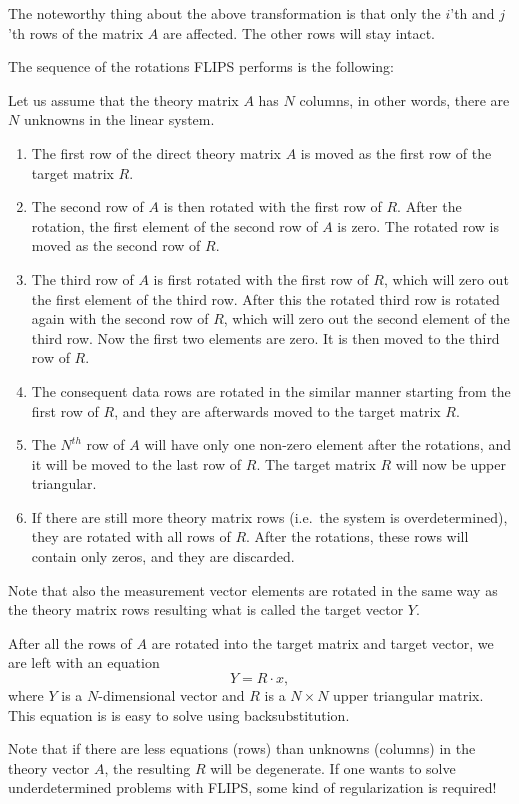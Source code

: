 \documentclass[a4paper,twoside]{refrep}
\begin{document}
\attention The noteworthy thing about the above transformation is that only the $i$'th and $j$'th rows of the matrix $A$ are affected. The other rows will stay intact.

The sequence of the rotations FLIPS performs is the following:

Let us assume that the theory matrix $A$ has $N$ columns, in other words, there are $N$ unknowns in the linear system.

\begin{enumerate}
\item The first row of the direct theory matrix $A$ is moved as the first row of the target matrix $R$.
\item The second row of $A$ is then rotated with the first row of $R$. After the rotation, the first element of the second row of $A$ is zero. The rotated row is moved as the second row of $R$.
\item The third row of $A$ is first rotated with the first row of $R$, which will zero out the first element of the third row. After this the rotated third row is rotated again with the second row of $R$, which will zero out the second element of the third row. Now the first two elements are zero. It is then moved to the third row of $R$.
\item The consequent data rows are rotated in the similar manner starting from the first row of $R$, and they are afterwards moved to the target matrix $R$.
\item The $N^{th}$ row of $A$ will have only one non-zero element after the rotations, and it will be moved to the last row of $R$. The target matrix $R$ will now be upper triangular.
\item If there are still more theory matrix rows (i.e.\ the system is overdetermined), they are rotated with all rows of $R$. After the rotations, these rows will contain only zeros, and they are discarded. 
\end{enumerate}

\attention Note that also the measurement vector elements are rotated in the same way as the theory matrix rows resulting what is called the target vector $Y$.

After all the rows of $A$ are rotated into the target matrix and target vector, we are left with an equation
\[
Y = R\cdot x,
\] 
where $Y$ is a $N$-dimensional vector and $R$ is a $N\times N$ upper triangular matrix. This equation is is easy to solve using backsubstitution.

\attention Note that if there are less equations (rows) than unknowns (columns) in the theory vector $A$, the resulting $R$ will be degenerate. If one wants to solve underdetermined problems with FLIPS, some kind of regularization is required!
\end{document}
